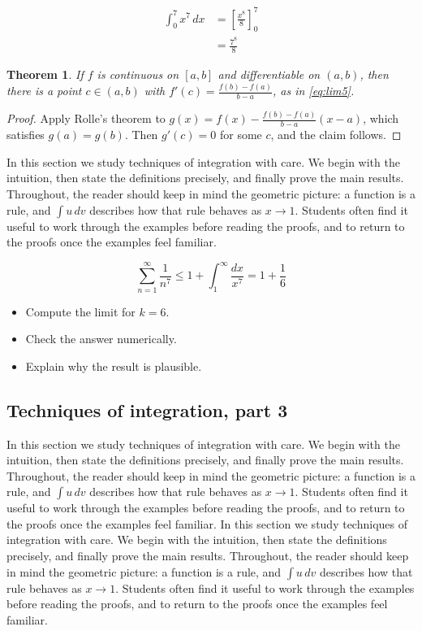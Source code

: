 \documentclass[11pt]{article}
\newtheorem{theorem}{Theorem}[section]
\begin{document}
\begin{align}
  \int_0^{7} x^{7}\,dx &= \left[ \frac{x^{8}}{8} \right]_0^{7} \\
  &= \frac{7^{8}}{8} \label{eq:int5}
\end{align}

\begin{theorem}
If $f$ is continuous on $[a,b]$ and differentiable on $(a,b)$, then there is a point $c \in (a,b)$ with $f'(c) = \frac{f(b)-f(a)}{b-a}$, as in \eqref{eq:lim5}.
\end{theorem}

\begin{proof}
Apply Rolle's theorem to $g(x) = f(x) - \frac{f(b)-f(a)}{b-a}(x-a)$, which satisfies $g(a) = g(b)$. Then $g'(c) = 0$ for some $c$, and the claim follows.
\end{proof}

In this section we study techniques of integration with care. We begin with the intuition, then state the definitions precisely, and finally prove the main results. Throughout, the reader should keep in mind the geometric picture: a function is a rule, and $\int u\,dv$ describes how that rule behaves as $x \to 1$. Students often find it useful to work through the examples before reading the proofs, and to return to the proofs once the examples feel familiar. 

\[
  \sum_{n=1}^{\infty} \frac{1}{n^{7}} \le 1 + \int_1^{\infty} \frac{dx}{x^{7}} = 1 + \frac{1}{6}
\]

\begin{itemize}
  \item Compute the limit for $k = 6$.
  \item Check the answer numerically.
  \item Explain why the result is plausible.
\end{itemize}

\subsection{Techniques of integration, part 3}

In this section we study techniques of integration with care. We begin with the intuition, then state the definitions precisely, and finally prove the main results. Throughout, the reader should keep in mind the geometric picture: a function is a rule, and $\int u\,dv$ describes how that rule behaves as $x \to 1$. Students often find it useful to work through the examples before reading the proofs, and to return to the proofs once the examples feel familiar. In this section we study techniques of integration with care. We begin with the intuition, then state the definitions precisely, and finally prove the main results. Throughout, the reader should keep in mind the geometric picture: a function is a rule, and $\int u\,dv$ describes how that rule behaves as $x \to 1$. Students often find it useful to work through the examples before reading the proofs, and to return to the proofs once the examples feel familiar. 
\end{document}
